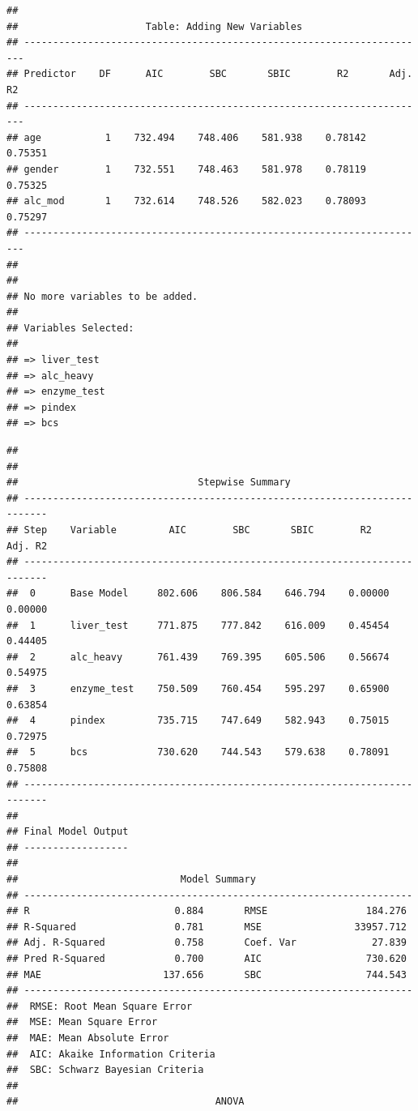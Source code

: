 \documentclass[
]{book}
\begin{document}
\begin{verbatim}
## 
##                      Table: Adding New Variables                       
## ----------------------------------------------------------------------
## Predictor    DF      AIC        SBC       SBIC        R2       Adj. R2 
## ----------------------------------------------------------------------
## age           1    732.494    748.406    581.938    0.78142    0.75351 
## gender        1    732.551    748.463    581.978    0.78119    0.75325 
## alc_mod       1    732.614    748.526    582.023    0.78093    0.75297 
## ----------------------------------------------------------------------
## 
## 
## No more variables to be added.
## 
## Variables Selected: 
## 
## => liver_test 
## => alc_heavy 
## => enzyme_test 
## => pindex 
## => bcs
\end{verbatim}

\begin{verbatim}
## 
## 
##                               Stepwise Summary                              
## --------------------------------------------------------------------------
## Step    Variable         AIC        SBC       SBIC        R2       Adj. R2 
## --------------------------------------------------------------------------
##  0      Base Model     802.606    806.584    646.794    0.00000    0.00000 
##  1      liver_test     771.875    777.842    616.009    0.45454    0.44405 
##  2      alc_heavy      761.439    769.395    605.506    0.56674    0.54975 
##  3      enzyme_test    750.509    760.454    595.297    0.65900    0.63854 
##  4      pindex         735.715    747.649    582.943    0.75015    0.72975 
##  5      bcs            730.620    744.543    579.638    0.78091    0.75808 
## --------------------------------------------------------------------------
## 
## Final Model Output 
## ------------------
## 
##                            Model Summary                            
## -------------------------------------------------------------------
## R                         0.884       RMSE                 184.276 
## R-Squared                 0.781       MSE                33957.712 
## Adj. R-Squared            0.758       Coef. Var             27.839 
## Pred R-Squared            0.700       AIC                  730.620 
## MAE                     137.656       SBC                  744.543 
## -------------------------------------------------------------------
##  RMSE: Root Mean Square Error 
##  MSE: Mean Square Error 
##  MAE: Mean Absolute Error 
##  AIC: Akaike Information Criteria 
##  SBC: Schwarz Bayesian Criteria 
## 
##                                  ANOVA                                  

\end{verbatim}
\end{document}
